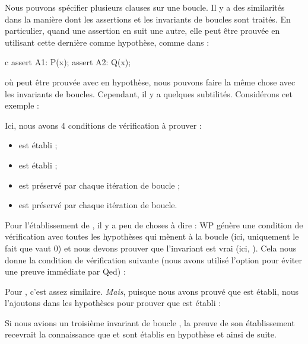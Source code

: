 

Nous pouvons spécifier plusieurs clauses  sur une
boucle. Il y a des similarités dans la manière dont les assertions et les
invariants de boucles sont traités. En particulier, quand une assertion en suit
une autre, elle peut être prouvée en utilisant cette dernière comme hypothèse,
comme dans :
\begin{CodeBlock}{c}
assert A1: P(x);
assert A2: Q(x);
\end{CodeBlock}
où  peut être prouvée avec  en hypothèse, nous
pouvons faire la même chose avec les invariants de boucles. Cependant, il y a
quelques subtilités. Considérons cet exemple :




Ici, nous avons 4 conditions de vérification à prouver :
\begin{itemize}
  \item {} est établi ;
  \item {} est établi ;
  \item {} est préservé par chaque itération de boucle ;
  \item {} est préservé par chaque itération de boucle.
\end{itemize}
Pour l'établissement de , il y a peu de choses à dire : WP
génère une condition de vérification avec toutes les hypothèses qui mènent à la
boucle (ici, uniquement le fait que  vaut 0) et nous devons
prouver que l'invariant est vrai (ici, ). Cela nous donne
la condition de vérification suivante (nous avons utilisé l'option
 pour éviter une preuve immédiate par Qed) :




Pour , c'est assez similaire. \textit{Mais}, puisque nous avons
prouvé que  est établi, nous l'ajoutons dans les hypothèses pour
prouver que  est établi :




Si nous avions un troisième invariant de boucle , la preuve de
son établissement recevrait la connaissance que  et 
sont établis en hypothèse et ainsi de suite.


